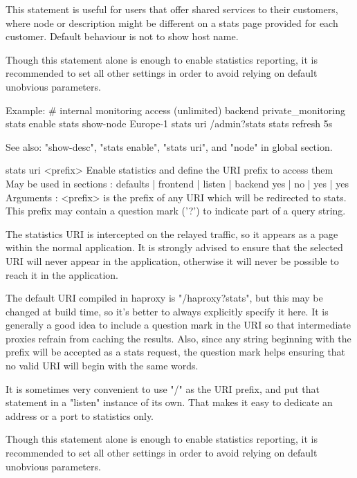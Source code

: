   This statement is useful for users that offer shared services to their
  customers, where node or description might be different on a stats page
  provided for each customer.  Default behaviour is not to show host name.

  Though this statement alone is enough to enable statistics reporting, it is
  recommended to set all other settings in order to avoid relying on default
  unobvious parameters.

  Example:
    # internal monitoring access (unlimited)
    backend private_monitoring
        stats enable
        stats show-node Europe-1
        stats uri       /admin?stats
        stats refresh   5s

  See also: "show-desc", "stats enable", "stats uri", and "node" in global
            section.


stats uri <prefix>
  Enable statistics and define the URI prefix to access them
  May be used in sections :   defaults | frontend | listen | backend
                                 yes   |    no    |   yes  |   yes
  Arguments :
    <prefix>  is the prefix of any URI which will be redirected to stats. This
              prefix may contain a question mark ('?') to indicate part of a
              query string.

  The statistics URI is intercepted on the relayed traffic, so it appears as a
  page within the normal application. It is strongly advised to ensure that the
  selected URI will never appear in the application, otherwise it will never be
  possible to reach it in the application.

  The default URI compiled in haproxy is "/haproxy?stats", but this may be
  changed at build time, so it's better to always explicitly specify it here.
  It is generally a good idea to include a question mark in the URI so that
  intermediate proxies refrain from caching the results. Also, since any string
  beginning with the prefix will be accepted as a stats request, the question
  mark helps ensuring that no valid URI will begin with the same words.

  It is sometimes very convenient to use "/" as the URI prefix, and put that
  statement in a "listen" instance of its own. That makes it easy to dedicate
  an address or a port to statistics only.

  Though this statement alone is enough to enable statistics reporting, it is
  recommended to set all other settings in order to avoid relying on default
  unobvious parameters.

